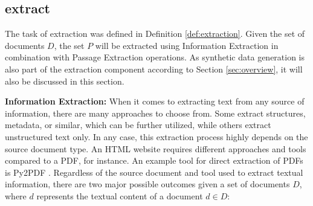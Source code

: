 



\subsection{extract}
\label{subsec:extract}

The task of extraction was defined in Definition \ref{def:extraction}. Given the set of documents $D$, the set $P$ will be extracted using Information Extraction in combination with Passage Extraction operations. As synthetic data generation is also part of the extraction component according to Section \ref{sec:overview}, it will also be discussed in this section.

\vspace{\baselineskip} %

\textbf{Information Extraction:} When it comes to extracting text from any source of information, there are many approaches to choose from. Some extract structures, metadata, or similar, which can be further utilized, while others extract unstructured text only. In any case, this extraction process highly depends on the source document type. An HTML website requires different approaches and tools compared to a PDF, for instance. An example tool for direct extraction of PDFs is Py2PDF \cite{noauthor_welcome_nodate}. Regardless of the source document and tool used to extract textual information, there are two major possible outcomes given a set of documents $D$, where $d$ represents the textual content of a document $d \in D$:

